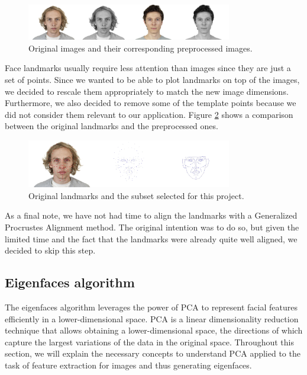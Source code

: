 \documentclass{article}
\begin{document}
\begin{figure}[H]
    \centering
    \vspace{0in}
    \includegraphics[width=0.8\textwidth]{images/original_vs_preprocessed.jpg}
    \caption{Original images and their corresponding preprocessed images.}
    \label{fig:preprocessed_images}
\end{figure}

Face landmarks usually require less attention than images since they are just a set of points. Since we wanted to be able to plot landmarks on top of the images, we decided to rescale them appropriately to match the new image dimensions. Furthermore, we also decided to remove some of the template points because we did not consider them relevant to our application. Figure \ref{fig:preprocessed_landmarks} shows a comparison between the original landmarks and the preprocessed ones.

\begin{figure}[H]
    \centering
    \vspace{0in}
    \includegraphics[width=0.8\textwidth]{images/original_vs_preprocessed_landmarks.jpg}
    \caption{Original landmarks and the subset selected for this project.}
    \label{fig:preprocessed_landmarks}
\end{figure}

As a final note, we have not had time to align the landmarks with a Generalized Procrustes Alignment method. The original intention was to do so, but given the limited time and the fact that the landmarks were already quite well aligned, we decided to skip this step.

\subsection{Eigenfaces algorithm}\label{algorithm_section}
The eigenfaces algorithm leverages the power of PCA to represent facial features efficiently in a lower-dimensional space. PCA is a linear dimensionality reduction technique that allows obtaining a lower-dimensional space, the directions of which capture the largest variations of the data in the original space. Throughout this section, we will explain the necessary concepts to understand PCA applied to the task of feature extraction for images and thus generating eigenfaces.
\end{document}
